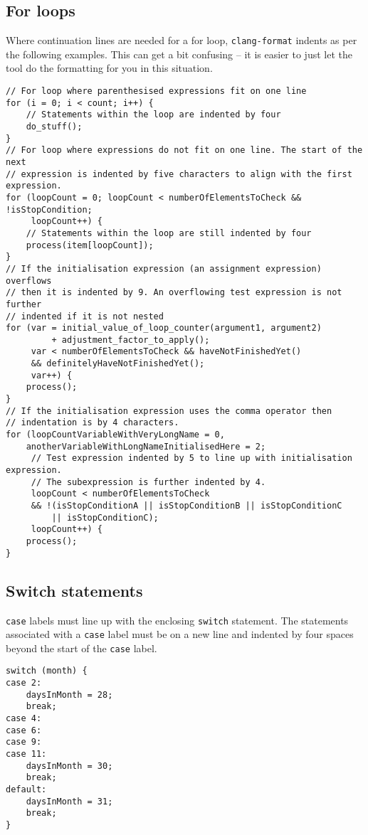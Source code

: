 \documentclass{article}
\begin{document}
\subsection{For loops} 
Where continuation lines are needed for a for loop, \texttt{clang-format} indents as per the following examples. This can get a bit confusing -- it is easier to just let the tool do the formatting for you in this situation. 

\nolinenumbers
{}
\begin{lstlisting}
// For loop where parenthesised expressions fit on one line
for (i = 0; i < count; i++) {
    // Statements within the loop are indented by four
    do_stuff();
}
// For loop where expressions do not fit on one line. The start of the next
// expression is indented by five characters to align with the first expression.
for (loopCount = 0; loopCount < numberOfElementsToCheck && !isStopCondition;
     loopCount++) {
    // Statements within the loop are still indented by four
    process(item[loopCount]);
}
// If the initialisation expression (an assignment expression) overflows
// then it is indented by 9. An overflowing test expression is not further
// indented if it is not nested
for (var = initial_value_of_loop_counter(argument1, argument2)
         + adjustment_factor_to_apply();
     var < numberOfElementsToCheck && haveNotFinishedYet()
     && definitelyHaveNotFinishedYet();
     var++) {
    process();
}
// If the initialisation expression uses the comma operator then
// indentation is by 4 characters.
for (loopCountVariableWithVeryLongName = 0,
    anotherVariableWithLongNameInitialisedHere = 2;
     // Test expression indented by 5 to line up with initialisation expression.
     // The subexpression is further indented by 4.
     loopCount < numberOfElementsToCheck
     && !(isStopConditionA || isStopConditionB || isStopConditionC
         || isStopConditionC);
     loopCount++) {
    process();
}
\end{lstlisting}
\linenumbers

\subsection{Switch statements}
\texttt{case} labels must line up with the enclosing \texttt{switch} statement. The statements associated with a \texttt{case}
label must be on a new line and indented by four spaces beyond the start of the \texttt{case} label.


\begin{lstlisting}
switch (month) {
case 2:
    daysInMonth = 28;
    break;
case 4:
case 6:
case 9:
case 11:
    daysInMonth = 30;
    break;
default:
    daysInMonth = 31;
    break;
}
\end{lstlisting}
\end{document}
